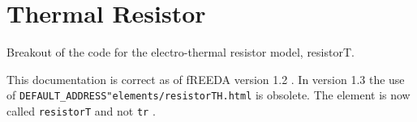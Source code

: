 

\chapter{Thermal Resistor}
Breakout of the code for the electro-thermal resistor model, resistorT.
\newpage

\noindent\epsfxsize=6.5in
This documentation is correct as of fREEDA version 1.2 . In version 1.3 the use of
\newline
 {\tt DEFAULT\_ADDRESS"elements/resistorTH.html} is obsolete.  The element is now called {\tt resistorT} and not {\tt tr} .

\noindent\epsfxsize=6.5in

\noindent\epsfxsize=6.5in